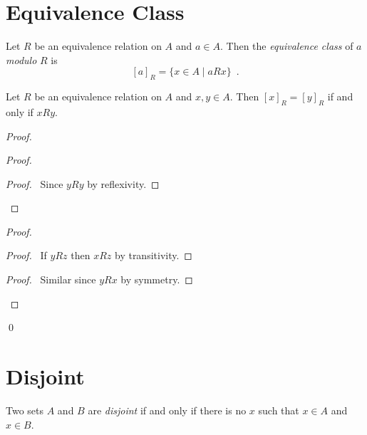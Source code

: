 \section{Equivalence Class}

\begin{definition}
    Let $R$ be an equivalence relation on $A$ and $a \in A$. Then the
    \emph{equivalence class} of $a$ \emph{modulo} $R$ is
    \[ [a]_R = \{ x \in A \mid aRx \} \enspace . \]
\end{definition}

\begin{lemma}
    \label{lemma:equivalence_classes}
    Let $R$ be an equivalence relation on $A$ and $x,y \in A$.
    Then $[x]_R = [y]_R$ if and only if $xRy$.
\end{lemma}

\begin{proof}
    \pf
    \begin{proof}
        \begin{proof}
            \pf\ Since $yRy$ by reflexivity.
        \end{proof}
    \end{proof}
    \begin{proof}
        \begin{proof}
            \pf\ If $yRz$ then $xRz$ by transitivity.
        \end{proof}
        \begin{proof}
            \pf\ Similar since $yRx$ by symmetry.
        \end{proof}
    \end{proof}
    \qed
\end{proof}

\section{Disjoint}

\begin{definition}[Disjoint]
    Two sets $A$ and $B$ are \emph{disjoint} if and only if there is no $x$
    such that $x \in A$ and $x \in B$.
\end{definition}

